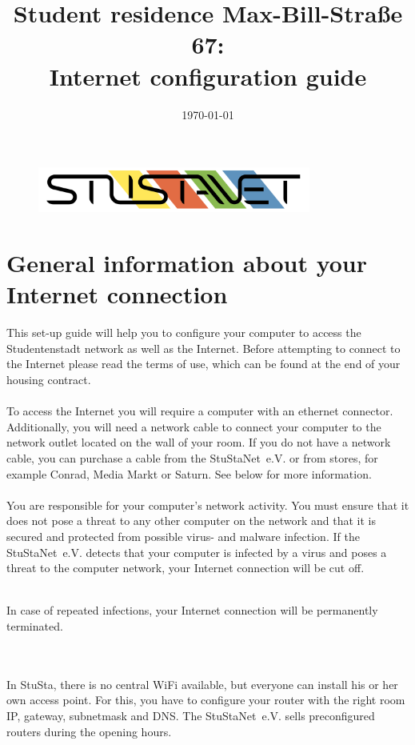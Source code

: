 \documentclass[a4paper,12pt]{scrartcl}
\title{Student residence Max-Bill-Straße 67:\\
       Internet configuration guide}
\date{\today}
\begin{document}
\maketitle

\begin{figure}[t!]
   \centering
   \vspace{-20pt}
   \includegraphics[width=0.8\textwidth,keepaspectratio]{Bilder/StuStaNet_Logo}
   \vspace{-20pt}
\end{figure}

\section*{General information about your Internet connection}

This set-up guide will help you to configure your computer to access the Studentenstadt network as well as the Internet. Before attempting to connect to the Internet please read the terms of use, which can be found at the end of your housing contract.
\\
\\
To access the Internet you will require a computer with an ethernet connector. Additionally, you will need a network cable to connect your computer to the network outlet located on the wall of your room. If you do not have a network cable, you can purchase a cable from the StuStaNet~e.V. or from stores, for example Conrad, Media Markt or Saturn. See below for more information.
\\
\\
You are responsible for your computer's network activity. You must ensure that it does not pose a threat to any other computer on the network and that it is secured and protected from possible virus- and malware infection. If the StuStaNet~e.V. detects that your computer is infected by a virus and poses a threat to the computer network, your Internet connection will be cut off.
\\
\begin{bfseries}
	\\In case of repeated infections, your Internet connection will be permanently terminated.
\end{bfseries}
\\
\\
In StuSta, there is no central WiFi available, but everyone can install his or her own access point. For this, you have to configure your router with the right room IP, gateway, subnetmask and DNS. The StuStaNet~e.V. sells preconfigured routers during the opening hours.
\end{document}
